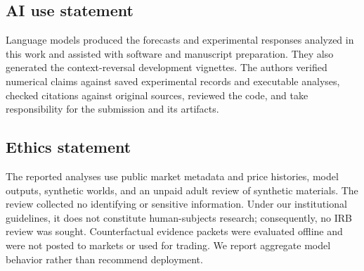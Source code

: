 \documentclass{article}
\begin{document}


\clearpage %
\subsection*{AI use statement}

Language models produced the forecasts and experimental responses analyzed in this work and assisted with software and manuscript preparation.
They also generated the context-reversal development vignettes.
The authors verified numerical claims against saved experimental records and executable analyses, checked citations against original sources, reviewed the code, and take responsibility for the submission and its artifacts.

\subsection*{Ethics statement}

The reported analyses use public market metadata and price histories, model outputs, synthetic worlds, and an unpaid adult review of synthetic materials.
The review collected no identifying or sensitive information.
Under our institutional guidelines, it does not constitute human-subjects research; consequently, no IRB review was sought.
Counterfactual evidence packets were evaluated offline and were not posted to markets or used for trading. We report aggregate model behavior rather than recommend deployment.
\end{document}
